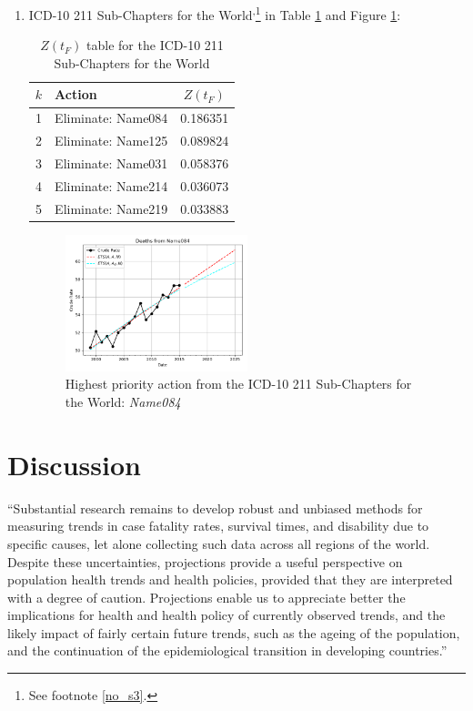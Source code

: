 \documentclass[12pt, a4paper, twocolumn]{article}
\begin{document}
\begin{enumerate}
  \item ICD-10 211 Sub-Chapters for the World\cite{whomortality}\textsuperscript{,}\footnote{See footnote \ref{no_s3}.} in Table \ref{table:ztable11} and Figure \ref{fig:k11}:
    \begin{table}[H]
      \centering
      \begin{tabular}{clc}
        \toprule
          $k$ & Action             & $Z(t_F)$ \\
        \midrule
          1   & Eliminate: Name084 & 0.186351 \\
          2   & Eliminate: Name125 & 0.089824 \\
          3   & Eliminate: Name031 & 0.058376 \\
          4   & Eliminate: Name214 & 0.036073 \\
          5   & Eliminate: Name219 & 0.033883 \\
        \bottomrule
      \end{tabular}
      \caption{$Z(t_F)$ table for the ICD-10 211 Sub-Chapters for the World}
      \label{table:ztable11}
    \end{table}
    \begin{figure}[H]
      \centering
      \includegraphics[width=0.5\textwidth]{results/WORLD_ICD10_SUB_CHAPTERS/Name084_ets.png}
      \caption{Highest priority action from the ICD-10 211 Sub-Chapters for the World: \textit{Name084}}\label{fig:k11}
    \end{figure}
\end{enumerate}

\section{Discussion}

\enquote{Substantial research remains to develop robust and unbiased methods for measuring trends in case fatality rates, survival times, and disability due to specific causes, let alone collecting such data across all regions of the world. Despite these uncertainties, projections provide a useful perspective on population health trends and health policies, provided that they are interpreted with a degree of caution. Projections enable us to appreciate better the implications for health and health policy of currently observed trends, and the likely impact of fairly certain future trends, such as the ageing of the population, and the continuation of the epidemiological transition in developing countries.}\cite{mathers2006projections}
\end{document}

